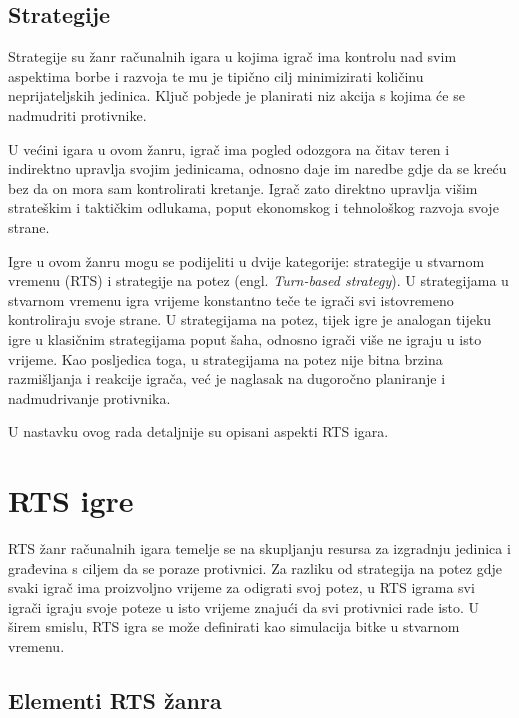 \documentclass[times, utf8, zavrsni, numeric]{fer}
\begin{document}
\section{Strategije}

\par Strategije su žanr računalnih igara u kojima igrač ima kontrolu nad svim aspektima borbe i razvoja te mu je tipično cilj minimizirati količinu neprijateljskih jedinica.
Ključ pobjede je planirati niz akcija s kojima će se nadmudriti protivnike.

\par U većini igara u ovom žanru, igrač ima pogled odozgora na čitav teren i indirektno upravlja svojim jedinicama, odnosno daje im naredbe gdje da se kreću bez da on mora sam kontrolirati kretanje.
Igrač zato direktno upravlja višim strateškim i taktičkim odlukama, poput ekonomskog i tehnološkog razvoja svoje strane.

\par Igre u ovom žanru mogu se podijeliti u dvije kategorije: strategije u stvarnom vremenu (RTS) i strategije na potez (engl. \textit{Turn-based strategy}).
U strategijama u stvarnom vremenu igra vrijeme konstantno teče te igrači svi istovremeno kontroliraju svoje strane.
U strategijama na potez, tijek igre je analogan tijeku igre u klasičnim strategijama poput šaha, odnosno igrači više ne igraju u isto vrijeme.
Kao posljedica toga, u strategijama na potez nije bitna brzina razmišljanja i reakcije igrača, već je naglasak na dugoročno planiranje i nadmudrivanje protivnika.

\par U nastavku ovog rada detaljnije su opisani aspekti RTS igara.

\chapter{RTS igre}\label{ch:rtsGames}

\par RTS žanr računalnih igara temelje se na skupljanju resursa za izgradnju jedinica i građevina s ciljem da se poraze protivnici. 
Za razliku od strategija na potez gdje svaki igrač ima proizvoljno vrijeme za odigrati svoj potez, u RTS igrama svi igrači igraju svoje poteze u isto vrijeme znajući da svi protivnici rade isto. 
U širem smislu, RTS igra se može definirati kao simulacija bitke u stvarnom vremenu.


\section{Elementi RTS žanra}
\end{document}

